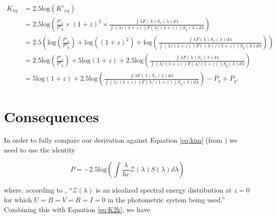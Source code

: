 \documentclass[aps,prl,reprint,amsmath]{revtex4-2}
\begin{document}
\begin{equation}
\begin{aligned}
\label{eq:K2k}
  K_{xy} &= 2.5\text{log}(K'_{xy}) \\
         &= 2.5\text{log}\left(
            \frac{P'_x}{P'_y} \times (1 + z)^2 \times
            \frac{\int \lambda F(\lambda) S_x(\lambda) d\lambda}
                 {\int (\lambda / (1+z)) F(\lambda / (1+z)) S_y(\lambda) d\lambda}\right) \\
         &= 2.5 \left(
            \text{log} \left( \frac{P'_x}{P'_y} \right)
            + \text{log}( {(1 + z)^2})
            + \text{log}\left( \frac{\int \lambda F(\lambda) S_x(\lambda) d\lambda}
                                    {\int (\lambda / (1+z)) F((\lambda)/ (1+z)) S_y(\lambda) d\lambda}
            \right) \right) \\
         &= 2.5 \text{log} \left( \frac{P'_x}{P'_y} \right)
            + 5 \text{log} (1 + z)
            + 2.5 \text{log} \left(
              \frac{\int \lambda F(\lambda) S_x(\lambda) d\lambda}
                   {\int (\lambda / (1+z)) F(\lambda / (1+z)) S_y(\lambda) d\lambda} \right) \\
         &= 5 \text{log} (1 + z)
            + 2.5 \text{log} \left(
              \frac{\int \lambda F(\lambda) S_x(\lambda) d\lambda}
                   {\int (\lambda / (1+z)) F(\lambda / (1+z)) S_y(\lambda) d\lambda} \right)
            - P_x + P_y .
\end{aligned}
\end{equation}

\section{Consequences}
\label{sec:consequences}

In order to fully compare our derivation against Equation \ref{eq:kim} (from
\citet{kim1996}) we need to use the identity

\begin{equation}
  P = -2.5 \text{log} \left( \int \frac{\lambda}{hc} \mathcal{Z}(\lambda) S(\lambda) d\lambda \right)
\end{equation}

\noindent where, according to \citet{kim1996}, ``$\mathcal{Z}(\lambda)$ is an
idealized spectral energy distribution at $z = 0$ for which
$U = B = V = R = I = 0$ in the photometric system being used.'' Combining this
with Equation \ref{eq:K2k}, we have
\end{document}
